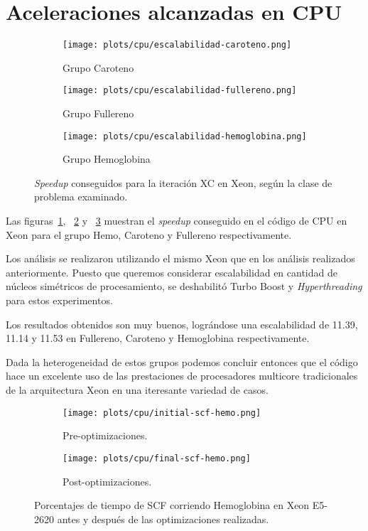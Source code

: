 \section{Aceleraciones alcanzadas en CPU}

\begin{figure}[htbp]
\centering
\begin{subfigure}[b]{\plotwidthtres}
   \texttt{[image: plots/cpu/escalabilidad-caroteno.png]}
   \caption{Grupo Caroteno}
   \label{fig:cpu-scalability-caroteno}
 \end{subfigure}
\begin{subfigure}[b]{\plotwidthtres}
   \texttt{[image: plots/cpu/escalabilidad-fullereno.png]}
   \caption{Grupo Fullereno}
   \label{fig:cpu-scalability-fullereno}
 \end{subfigure}
\begin{subfigure}[b]{\plotwidthtres}
   \texttt{[image: plots/cpu/escalabilidad-hemoglobina.png]}
   \caption{Grupo Hemoglobina}
   \label{fig:cpu-scalability-hemo}
 \end{subfigure}
 \caption{\textit{Speedup} conseguidos para la iteraci\'on XC en Xeon, seg\'un
 la clase de problema examinado.}
 \label{fig:cpu-scalability}
\end{figure}

Las figuras~\ref{fig:cpu-scalability-caroteno}, ~\ref{fig:cpu-scalability-fullereno} y
~\ref{fig:cpu-scalability-hemo} muestran el \textit{speedup} conseguido en
el c\'odigo de CPU en Xeon para el grupo Hemo, Caroteno y Fullereno respectivamente.

Los an\'alisis se realizaron utilizando el mismo Xeon que en los an\'alisis
realizados anteriormente. Puesto que queremos considerar escalabilidad en cantidad
de n\'ucleos sim\'etricos de procesamiento, se deshabilit\'o Turbo Boost y
\textit{Hyperthreading} para estos experimentos.

Los resultados obtenidos son muy buenos, logr\'andose una escalabilidad de 11.39,
11.14 y 11.53 en Fullereno, Caroteno y Hemoglobina respectivamente.

Dada la heterogeneidad de estos grupos podemos concluir entonces que el c\'odigo
hace un excelente uso de las prestaciones de procesadores multicore tradicionales
de la arquitectura Xeon en una iteresante variedad de casos.

\begin{figure}[htbp]
\centering
\begin{subfigure}[b]{\plotwidthtres}
   \texttt{[image: plots/cpu/initial-scf-hemo.png]}
   \caption{Pre-optimizaciones.}
   \label{fig:initial-cpu-scf}
 \end{subfigure}
 \begin{subfigure}[b]{\plotwidthtres}
   \texttt{[image: plots/cpu/final-scf-hemo.png]}
   \caption{Post-optimizaciones.}
   \label{fig:final-cpu-scf}
 \end{subfigure}
 \caption{Porcentajes de tiempo de SCF corriendo Hemoglobina en Xeon E5-2620 antes y despu\'es de
 las optimizaciones realizadas.}
 \label{fig:cpu-scf}
\end{figure}

